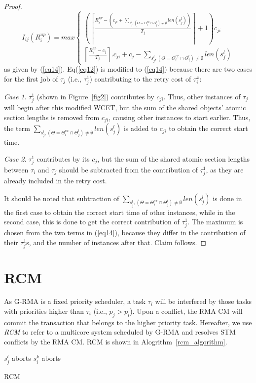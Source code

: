 \begin{proof}
\begin{equation*}
I_{ij}(R_i^{up})=max\begin{cases}
\left(\left\lceil\frac{R_i^{up}-\left(c_{ji}+\sum_{s_j^l,\left(\Theta=\Theta_i^{ex} \cap \Theta_j^l\right)\neq \emptyset} len(s_j^l)\right)}{T_{j}}\right\rceil+1 \right)c_{ji}\\
\left\lceil\frac{R_i^{up}-c_{j}}{T_{j}}\right\rceil.c_{ji}+c_{j}-\sum_{s_j^l,\left(\Theta=\Theta_i^{ex} \cap \Theta_j^l\right)\neq \emptyset} {len(s_j^l)}\end{cases}\end{equation*}
%
as given by (\ref{eq14}). Eq(\ref{eq12}) is modified to (\ref{eq14}) because there are two cases for the first job of $\tau_j$ (i.e., $\tau_j^1$) contributing to the retry cost of $\tau_i^x$:

\textit{Case 1}. $\tau_j^1$ (shown in Figure~\ref{fig2}) contributes by $c_{ji}$. Thus, other instances of $\tau_j$ will begin after this modified WCET, but the sum of the shared objects' atomic section lengths is removed from $c_{ji}$, causing other instances to start earlier. Thus, the term $\sum_{s_j^l,\left(\Theta=\Theta_i^{ex} \cap \Theta_j^l\right)\neq \emptyset} {len(s_j^l)}$ is added to $c_{ji}$ to obtain the correct start time. 

\textit{Case 2}. $\tau_j^1$ contributes by its $c_j$, but the sum of the shared atomic section lengths  between $\tau_i$ and $\tau_j$ should be subtracted from the contribution of $\tau_j^1$, as they are already included in the retry cost. 

It should be noted that subtraction of $\sum_{s_j^l,\left(\Theta=\Theta_i^{ex} \cap \Theta_j^l\right)\neq \emptyset} {len(s_j^l)}$ is done in the first case to obtain the correct start time of other instances, while in the second case, this is done to get the correct contribution of $\tau_j^1$. The maximum is chosen from the two terms in (\ref{eq14}), because they differ in the contribution of their $\tau_j^1$s, and the number of instances after that. Claim follows.
%
\end{proof}
%
\section{RCM}
\label{sec:g-rma-rma-cm}
%
As G-RMA is a fixed priority scheduler,  a task $\tau_{i}$ will be interfered by those tasks with priorities higher than $\tau_{i}$ (i.e., $p_{j}>p_{i}$).  Upon a conflict, the RMA CM will commit the transaction that belongs to the higher priority task. Hereafter, we use \emph{RCM} to refer to a multicore system scheduled by G-RMA and resolves STM conflicts by the RMA CM. RCM is shown in Alogrithm~\ref{rcm_algorithm}.
\begin{algorithm}
\footnotesize{
\LinesNumbered
{}
	{$s_j^l$ aborts\label{rcm:step_sicommits}\;}
	{$s_i^k$ aborts\label{rcm:step_siaborts}\;}
	}
\caption{RCM}
\label{rcm_algorithm}
\end{algorithm}

